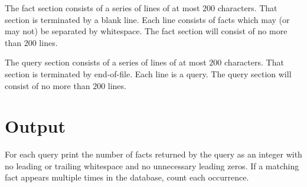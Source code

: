 The fact section consists of a series of lines of at most $200$ characters.
That section is terminated by a blank line. Each line consists of facts
which may (or may not) be separated by whitespace. The fact section will consist
of no more than $200$ lines.

The query section consists of a series of lines of at most $200$
characters. That section is terminated by end-of-file.  Each line is
a query. The query section will consist of no more than $200$ lines.

\section*{Output}

For each query print the number of facts returned by the query as an
integer with no leading or trailing whitespace and no unnecessary leading
zeros. If a matching fact appears multiple times in the database, count each occurrence.


